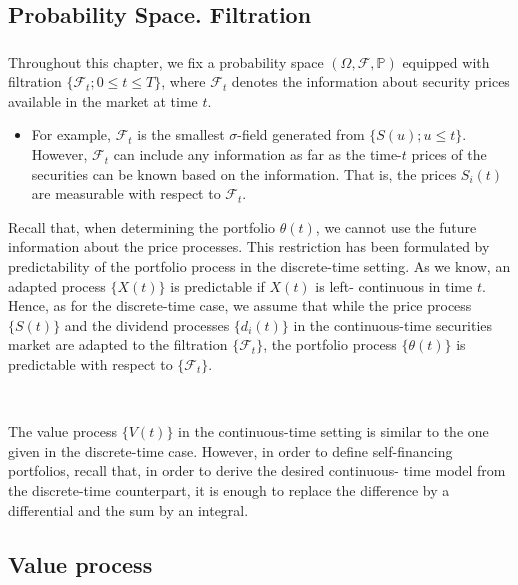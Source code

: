 \documentclass[c, dvipsnames, 8pt]{beamer}
\begin{document}
\subsection{Probability Space. Filtration}

\begin{frame}[shrink=5]

\frametitle{\insertsection} 
\framesubtitle{\insertsubsection} 

Throughout this chapter, we fix a probability space $(\Omega, \mathcal{F}, \mathbb{P})$ equipped with
filtration $\{\mathcal{F}_t; 0 \leq t \leq T\}$, where $\mathcal{F}_t$ denotes the information about security
prices available in the market at time $t$. 
\begin{itemize}
	\item For example, $\mathcal{F}_t$ is the smallest $\sigma$-field
generated from $\{S(u); u \leq t\}$. However, $\mathcal{F}_t$ can include any information as far 
as the time-$t$ prices of the securities can be known based on the information.
That is, the prices $S_i(t)$ are measurable with respect to $\mathcal{F}_t$.
\end{itemize}
Recall that, when determining the portfolio $\theta(t)$, we cannot use the future
information about the price processes. This restriction has been formulated
by predictability of the portfolio process in the discrete-time setting. As we
know, an adapted process $\{X(t)\}$ is predictable if $X(t)$ is left-
continuous in time $t$. Hence, as for the discrete-time case, we assume that while
the price process $\{S(t)\}$ and the dividend processes $\{d_i(t)\}$ in the continuous-time securities market are adapted to the filtration $\{\mathcal{F}_t\}$, the portfolio process
$\{\theta(t)\}$ is predictable with respect to $\{\mathcal{F}_t\}$.

\

The value process $\{V (t)\}$ in the continuous-time setting is similar to the one 
given in the discrete-time case. However,  in order to define self-financing portfolios, recall that, in order to derive the desired continuous-
time model from the discrete-time counterpart, it is enough to replace the
difference by a differential and the sum by an integral.



\end{frame}


\subsection{Value process}
\end{document}
